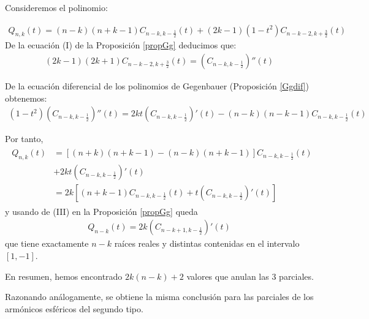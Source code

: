 \medskip

Consideremos el polinomio:

\begin{gather*}
Q_{n,k}(t) =(n-k)(n+k-1)C_{n-k,k-\frac{1}{2}}(t)+(2k-1)(1-t^2)C_{n-k-2,k+\frac{3}{2}}(t)
\end{gather*}
De la ecuación (I) de la Proposición \ref{propGg} deducimos que:
\begin{gather*}
(2k-1)(2k+1)C_{n-k-2,k+\frac{3}{2}}(t) = \left(C_{n-k,k-\frac{1}{2}}\right)'' (t)
\end{gather*}

De la ecuación diferencial de los polinomios de Gegenbauer (Proposición \ref{Ggdif}) obtenemos:
\begin{gather*}
(1-t^2)\left(C_{n-k,k-\frac{1}{2}}\right)'' (t) = 2kt\left(C_{n-k,k-\frac{1}{2}}\right)'(t)-(n-k)(n-k-1)C_{n-k,k-\frac{1}{2}}(t)
\end{gather*}

Por tanto,
\begin{gather*}
\begin{aligned}
Q_{n,k}(t) &= \left[(n+k)(n+k-1)-(n-k)(n+k-1)\right] C_{n-k,k-\frac{1}{2}}(t) \\&+ 2kt\left(C_{n-k,k-\frac{1}{2}}\right)'(t) \\&= 2k\left[(n+k-1)C_{n-k,k-\frac{1}{2}}(t)+ t\left(C_{n-k,k-\frac{1}{2}}\right)'(t)\right]
\end{aligned}
\end{gather*}
y usando de (III) en la Proposición \ref{propGg} queda
\begin{gather*}
Q_{n-k}(t) = 2k\left(C_{n-k+1,k-\frac{1}{2}}\right)'(t)
\end{gather*}
que tiene exactamente $n-k$ raíces reales y distintas contenidas en el intervalo $[1,-1]$.

En resumen, hemos encontrado $2k(n-k)+2$ valores que anulan las 3 parciales.

\medskip
Razonando análogamente, se obtiene la misma conclusión para las parciales de los armónicos esféricos del segundo tipo.

\bigskip


